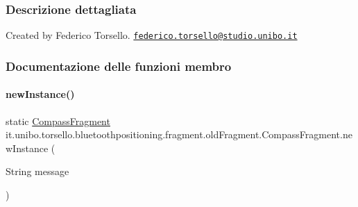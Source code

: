 \subsubsection{Descrizione dettagliata}
Created by Federico Torsello. \href{mailto:federico.torsello@studio.unibo.it}{\tt federico.\+torsello@studio.\+unibo.\+it} 

\subsubsection{Documentazione delle funzioni membro}
\hypertarget{classit_1_1unibo_1_1torsello_1_1bluetoothpositioning_1_1fragment_1_1oldFragment_1_1CompassFragment_a679cc6d37eb185a303b003939ea92b7b_a679cc6d37eb185a303b003939ea92b7b}{}\label{classit_1_1unibo_1_1torsello_1_1bluetoothpositioning_1_1fragment_1_1oldFragment_1_1CompassFragment_a679cc6d37eb185a303b003939ea92b7b_a679cc6d37eb185a303b003939ea92b7b} 
\paragraph{\texorpdfstring{new\+Instance()}{newInstance()}}
{\footnotesize\ttfamily static \hyperlink{classit_1_1unibo_1_1torsello_1_1bluetoothpositioning_1_1fragment_1_1oldFragment_1_1CompassFragment}{Compass\+Fragment} it.\+unibo.\+torsello.\+bluetoothpositioning.\+fragment.\+old\+Fragment.\+Compass\+Fragment.\+new\+Instance (\begin{DoxyParamCaption}\item[{String}]{message }\end{DoxyParamCaption})\hspace{0.3cm}{\ttfamily [static]}}


